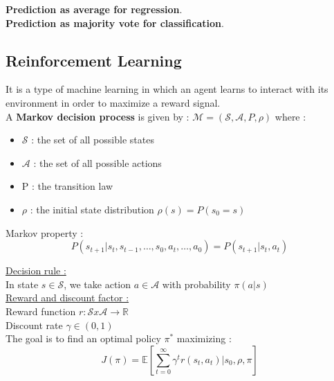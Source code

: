 \documentclass[../main.tex]{subfiles}
\begin{document}
\textbf{Prediction as average for regression}.\\
\textbf{Prediction as majority vote for classification}.\\

\subsection{Reinforcement Learning}

It is a type of machine learning in which an agent learns to interact with its environment in order to maximize a reward signal.\\

A \textbf{Markov decision process} is given by : $\mathcal{M} = (\mathcal{S}, \mathcal{A}, P,\rho)$ where : \begin{itemize}
    \item $\mathcal{S}$ : the set of all possible states\\
    \item $\mathcal{A}$ : the set of all possible actions\\
    \item P : the transition law\\
    \item $\rho$ : the initial state distribution $\rho(s) = P(s_0=s)$\\
\end{itemize}

Markov property : \begin{equation}
    P(s_{t+1} \lvert s_t, s_{t-1}, \dots, s_0, a_t, \dots, a_0) = P(s_{t+1} \lvert s_t,a_t)
\end{equation}

\quad \underline{Decision rule :}\\
In state $s\in \mathcal{S}$, we take action $a\in \mathcal{A}$ with probability $\pi(a\lvert s)$\\

\quad \underline{Reward and discount factor :}\\
Reward function $r: \mathcal{S}x\mathcal{A} \rightarrow \mathbb{R}$\\
Discount rate $\gamma \in (0,1)$\\

The goal is to find an optimal policy $\pi^*$ maximizing : \begin{equation}
    J(\pi) = \mathbb{E} [\sum_{t=0}^\infty \gamma^t r(s_t,a_t)\lvert s_0, \rho, \pi]
\end{equation}
\end{document}
